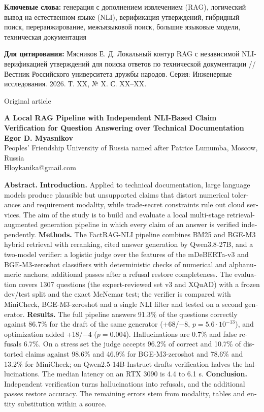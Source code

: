 \documentclass[14pt,a4paper]{extarticle}
\begin{document}
\begin{singlespace*}
\textbf{Ключевые слова:} генерация с дополнением извлечением (RAG), логический вывод на естественном языке (NLI), верификация утверждений, гибридный поиск, переранжирование, межъязыковой поиск, большие языковые модели, техническая документация

\textbf{Для цитирования:} Мясников Е. Д. Локальный контур RAG с независимой NLI-верификацией утверждений для поиска ответов по технической документации // Вестник Российского университета дружбы народов. Серия: Инженерные исследования. 2026. Т. XX, № X. С. XX–XX.

\begin{otherlanguage}{english}
\vspace{6pt}\noindent Original article
\begin{center}\normalsize\textbf{A Local RAG Pipeline with Independent NLI-Based Claim Verification for Question Answering over Technical Documentation}\\[12pt]
\small\textbf{Egor D. Myasnikov}\\
Peoples' Friendship University of Russia named after Patrice Lumumba, Moscow, Russia\\Hloykanika@gmail.com\end{center}
\textbf{Abstract.} \textbf{Introduction.} Applied to technical documentation, large language models produce plausible but unsupported claims that distort numerical tolerances and requirement modality, while trade-secret constraints rule out cloud services. The aim of the study is to build and evaluate a local multi-stage retrieval-augmented generation pipeline in which every claim of an answer is verified independently. \textbf{Methods.} The FactRAG-NLI pipeline combines BM25 and BGE-M3 hybrid retrieval with reranking, cited answer generation by Qwen3.8-27B, and a two-model verifier: a logistic judge over the features of the mDeBERTa-v3 and BGE-M3-zeroshot classifiers with deterministic checks of numerical and alphanumeric anchors; additional passes after a refusal restore completeness. The evaluation covers 1307 questions (the expert-reviewed set v3 and XQuAD) with a frozen dev/test split and the exact McNemar test; the verifier is compared with MiniCheck, BGE-M3-zeroshot and a single NLI filter and tested on a second generator. \textbf{Results.} The full pipeline answers 91.3\% of the questions correctly against 86.7\% for the draft of the same generator (+68/−8, $p = 5.6 \cdot 10^{-13}$), and optimization added +18/−4 ($p = 0.004$). Hallucinations are 0.7\% and false refusals 6.7\%. On a stress set the judge accepts 96.2\% of correct and 10.7\% of distorted claims against 98.6\% and 46.9\% for BGE-M3-zeroshot and 78.6\% and 13.2\% for MiniCheck; on Qwen2.5-14B-Instruct drafts verification halves the hallucinations. The median latency on an RTX 3090 is 4.4 to 6.1 s. \textbf{Conclusion.} Independent verification turns hallucinations into refusals, and the additional passes restore accuracy. The remaining errors stem from modality, tables and entity substitution within a source.


\end{otherlanguage}
\end{singlespace*}
\end{document}
